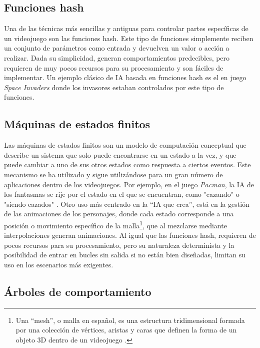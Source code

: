 \subsection{Funciones hash}

Una de las técnicas más sencillas y antiguas para controlar partes específicas de un videojuego son las funciones hash. Este tipo de funciones simplemente reciben un conjunto de parámetros como entrada y devuelven un valor o acción a realizar. Dada su simplicidad, generan comportamientos predecibles, pero requieren de muy pocos recursos para su procesamiento y son fáciles de implementar. Un ejemplo clásico de IA basada en funciones hash es el en juego \textit{Space Invaders} \cite{wikipedia_artificial_2025} donde los invasores estaban controlados por este tipo de funciones.

\subsection{Máquinas de estados finitos}

Las máquinas de estados finitos son un modelo de computación conceptual que describe un sistema que solo puede encontrarse en un estado a la vez, y que puede cambiar a uno de sus otros estados como respuesta a ciertos eventos. Este mecanismo se ha utilizado y sigue utilizándose para un gran número de aplicaciones dentro de los videojuegos. Por ejemplo, en el juego \textit{Pac\-man}, la IA de los fantasmas se rije por el estado en el que se encuentran, como "cazando" o "siendo cazados" \cite{mike_game_2016}. Otro uso más centrado en la ``IA que crea'', está en la gestión de las animaciones de los personajes, donde cada estado corresponde a una posición o movimiento específico de la malla\footnote{Una ``mesh'', o malla en español, es una estructura tridimensional formada por una colección de vértices, aristas y caras que definen la forma de un objeto 3D dentro de un videojuego \cite{universidad_europea_que_2025}.}, que al mezclarse mediante interpolaciones generan animaciones. Al igual que las funciones hash, requieren de pocos recursos para su procesamiento, pero su naturaleza determinista y la posibilidad de entrar en bucles sin salida si no están bien diseñadas, limitan su uso en los escenarios más exigentes.

\subsection{Árboles de comportamiento}

